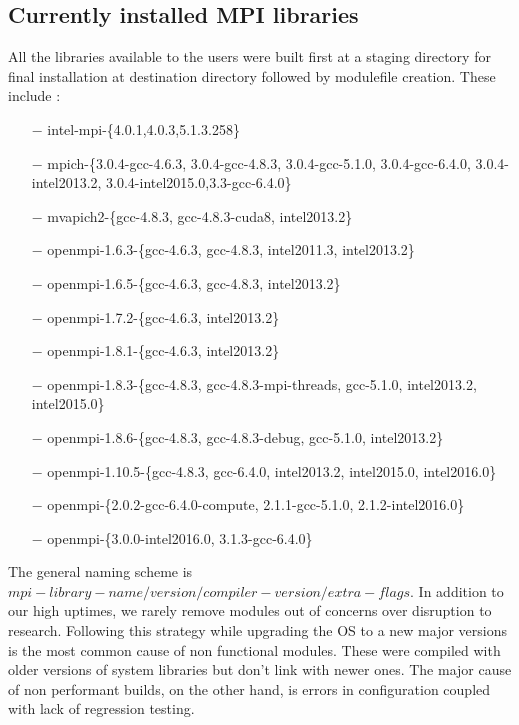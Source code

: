 \documentclass[sigconf,authordraft]{acmart}
\begin{document}
\subsection{Currently installed MPI libraries}
All the libraries available to the users were built first at a staging directory
for final installation at destination directory followed by modulefile creation. These include :
\begin{itemize}
	\item[$-$] intel-mpi-\{4.0.1,4.0.3,5.1.3.258\}
	\item[$-$] mpich-\{3.0.4-gcc-4.6.3, 3.0.4-gcc-4.8.3, 3.0.4-gcc-5.1.0, 	3.0.4-gcc-6.4.0, 3.0.4-intel2013.2, 3.0.4-intel2015.0,3.3-gcc-6.4.0\}
	\item[$-$]mvapich2-\{gcc-4.8.3, gcc-4.8.3-cuda8, intel2013.2\}
	\item[$-$]openmpi-1.6.3-\{gcc-4.6.3, gcc-4.8.3, intel2011.3, intel2013.2\}
	\item[$-$]openmpi-1.6.5-\{gcc-4.6.3, gcc-4.8.3, intel2013.2\}
	\item[$-$]openmpi-1.7.2-\{gcc-4.6.3, intel2013.2\}		\item[$-$]openmpi-1.8.1-\{gcc-4.6.3, intel2013.2\}
	\item[$-$]openmpi-1.8.3-\{gcc-4.8.3, gcc-4.8.3-mpi-threads, gcc-5.1.0, 	intel2013.2, intel2015.0\}
	\item[$-$]openmpi-1.8.6-\{gcc-4.8.3, gcc-4.8.3-debug, gcc-5.1.0, intel2013.2\}
	\item[$-$]openmpi-1.10.5-\{gcc-4.8.3, gcc-6.4.0, intel2013.2, intel2015.0, intel2016.0\}
	\item[$-$]openmpi-\{2.0.2-gcc-6.4.0-compute, 2.1.1-gcc-5.1.0, 2.1.2-intel2016.0\}
	\item[$-$]openmpi-\{3.0.0-intel2016.0, 3.1.3-gcc-6.4.0\}
\end{itemize} 
The general naming scheme is  $mpi-library-name/version/compiler-version/extra-flags$. In addition to our high uptimes, we rarely remove modules out of concerns over disruption to research. Following this strategy while upgrading the OS to a new major versions is the most common cause of non functional modules. These were compiled with older versions of system libraries but don't link with newer ones. The major cause of non performant builds, on the other hand, is errors in configuration coupled with lack of regression testing.
\end{document}
